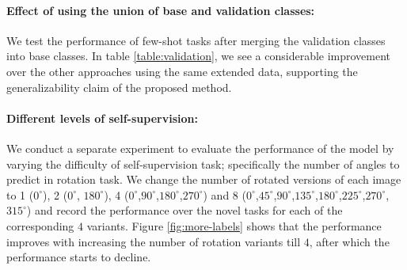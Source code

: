 \documentclass[10pt,twocolumn,letterpaper]{article}
\begin{document}
\paragraph{Effect of using the union of base and validation classes:}
We test the performance of few-shot tasks after merging the validation classes into base classes. In table \ref{table:validation}, we see a considerable improvement over the other approaches using the same extended data, supporting the generalizability claim of the proposed method.


\paragraph{Different levels of self-supervision:}
We conduct a separate experiment to evaluate the performance of the model by varying the difficulty of self-supervision task; specifically the number of angles to predict in rotation task. We change the number of rotated versions of each image to 1 ($0^{\circ}$), 2 ($0^{\circ}$, $180^{\circ}$), 4 ($0^{\circ}$,$90^{\circ}$,$180^{\circ}$,$270^{\circ}$) and 8 ($0^{\circ}$,$45^{\circ}$,$90^{\circ}$,$135^{\circ}$,$180^{\circ}$,$225^{\circ}$,$270^{\circ}$,$315^{\circ}$) and record the performance over the novel tasks for each of the corresponding $4$ variants. Figure \ref{fig:more-labels} shows that the performance improves with increasing the number of rotation variants till $4$, after which the performance starts to decline.
\end{document}
